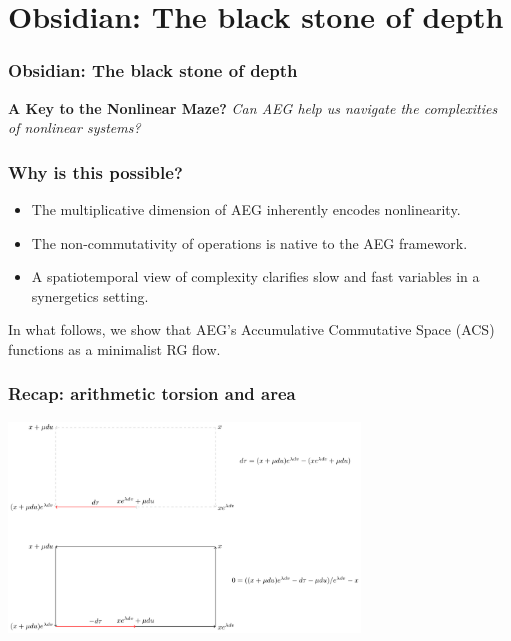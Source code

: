 \documentclass[aspectratio=169]{beamer}
\begin{document}
\section{Obsidian: The black stone of depth}

\begin{frame}
    \frametitle{Obsidian: The black stone of depth}
    \begin{center}
        \Large
        \textbf{A Key to the Nonlinear Maze?}
        \newline\newline
        \emph{Can AEG help us navigate the complexities of nonlinear systems?}
    \end{center}
\end{frame}

\begin{frame}
    \frametitle{Why is this possible?}
    \begin{itemize}
        \item The multiplicative dimension of AEG inherently encodes nonlinearity.
        \item The non-commutativity of operations is native to the AEG framework.
        \item A spatiotemporal view of complexity clarifies slow and fast variables in a synergetics setting.
    \end{itemize}
    In what follows, we show that AEG's Accumulative Commutative Space (ACS) functions as a minimalist RG flow.
\end{frame}

\begin{frame}
    \frametitle{Recap: arithmetic torsion and area}
    \begin{center}
        \includegraphics[width=0.7\textwidth]{../images/19-curl}
    \end{center}
\end{frame}
\end{document}
